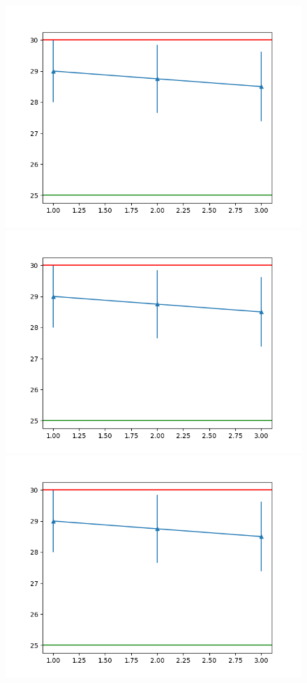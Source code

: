 \documentclass[9pt]{article}
\begin{document}
\begin{figure}
\begin{multicols}{2}
    \includegraphics[width=\linewidth,scale=0.5]{b}
    \includegraphics[width=\linewidth,scale=0.5]{b}
    \includegraphics[width=\linewidth,scale=0.5]{b}

\end{multicols}
\end{figure}
\end{document}
